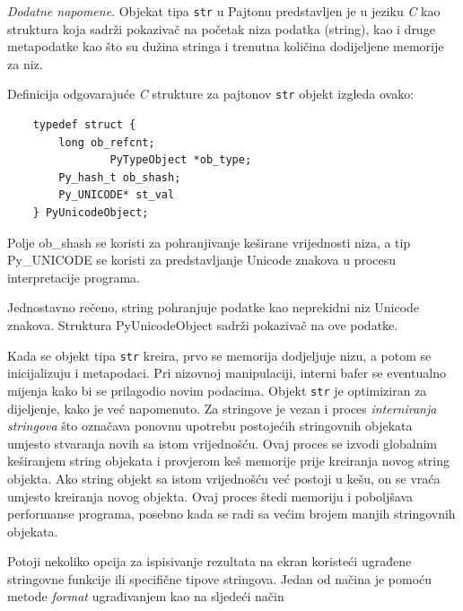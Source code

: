 \textit{Dodatne napomene}. Objekat tipa \texttt{str} u Pajtonu predstavljen je u jeziku \textit{C} kao struktura koja sadrži pokazivač na početak niza podatka (string), kao i druge metapodatke kao što su dužina stringa i trenutna količina dodijeljene memorije za niz.

Definicija odgovarajuće \textit{C} strukture za pajtonov \texttt{str} objekt izgleda ovako:

\begin{verbatim}
	typedef struct {
		long ob_refcnt;
                PyTypeObject *ob_type;
		Py_hash_t ob_shash;
		Py_UNICODE* st_val
	} PyUnicodeObject;
\end{verbatim}

Polje ob\_shash se koristi za pohranjivanje keširane vrijednosti niza, a tip Py\_UNICODE se koristi za predstavljanje Unicode znakova u procesu interpretacije programa. %
 
Jednostavno rečeno, string  pohranjuje  podatke kao neprekidni niz Unicode znakova. %
Struktura PyUnicodeObject sadrži pokazivač na ove podatke.


Kada se objekt tipa \texttt{str} kreira, prvo se memorija dodjeljuje nizu, a potom se inicijalizuju i metapodaci. Pri nizovnoj manipulaciji, interni bafer se eventualno mijenja kako bi se prilagodio novim podacima. Objekt \texttt{str} je   optimiziran za dijeljenje, kako je već napomenuto. %
 Za stringove je vezan i proces   \textit{interniranja stringova} što označava ponovnu upotrebu postojećih stringovnih objekata umjesto stvaranja novih sa istom vrijednošću. Ovaj proces se izvodi   globalnim keširanjem string objekata i provjerom    keš memorije prije kreiranja novog string objekta. Ako string objekt sa istom vrijednošću već postoji u kešu, on se vraća umjesto kreiranja novog objekta. Ovaj proces štedi memoriju i poboljšava performanse programa, posebno kada se radi sa većim brojem manjih stringovnih objekata.


Potoji nekoliko opcija za ispisivanje rezultata na ekran koristeći ugrađene stringovne funkcije ili specifične tipove stringova. Jedan od načina je pomoću metode \textit{format} ugrađivanjem kao na sljedeći način

